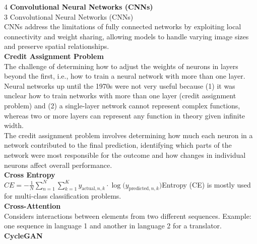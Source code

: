 \documentclass[8pt]{extarticle}
\begin{document}
\begin{multicols}{4}
\vspace{2pt}\textbf{Convolutional Neural Networks (CNNs)}\\
3 Convolutional Neural Networks (CNNs)\\
CNNs address the limitations of fully connected networks by exploiting local connectivity and weight sharing, allowing models to handle varying image sizes and preserve spatial relationships.\\
\vspace{2pt}\textbf{Credit Assignment Problem}\\
The challenge of determining how to adjust the weights of neurons in layers beyond the first, i.e., how to train a neural network with more than one layer.\\
Neural networks up until the 1970s were not very useful because (1) it was unclear how to train networks with more than one layer (credit assignment problem) and (2) a single-layer network cannot represent complex functions, whereas two or more layers can represent any function in theory given infinite width.\\
The credit assignment problem involves determining how much each neuron in a network contributed to the final prediction, identifying which parts of the network were most responsible for the outcome and how changes in individual neurons affect overall performance.\\
\vspace{2pt}\textbf{Cross Entropy}\\
$CE = -\frac{1}{N} \sum_{n=1}^{N} \sum_{k=1}^{K} y_{\text{actual},n,k} \cdot \log\bigl(y_{\text{predicted},n,k}\bigr)$\Cross Entropy (CE) is mostly used for multi-class classification problems.\\
\vspace{2pt}\textbf{Cross-Attention}\\
Considers interactions between elements from two different sequences. Example: one sequence in language 1 and another in language 2 for a translator.\\
\vspace{2pt}\textbf{CycleGAN}\\


\end{multicols}
\end{document}
